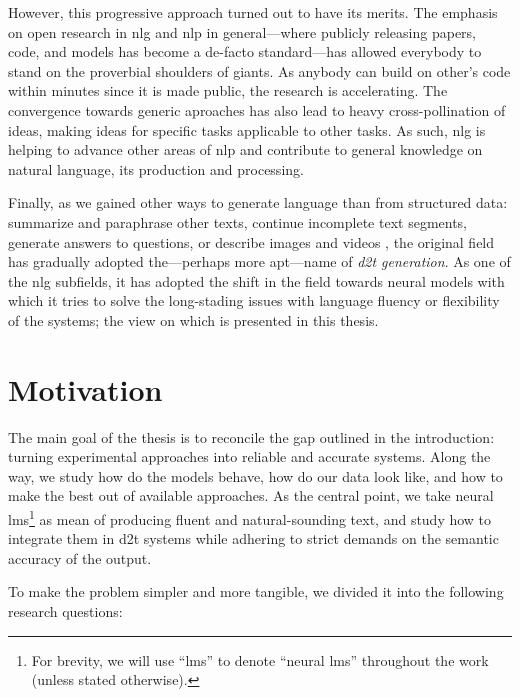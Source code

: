 \documentclass[12pt,notitlepage,a4paper,openright]{report}
\begin{document}
However, this progressive approach turned out to have its merits. The emphasis on open research in \ac{nlg} and \ac{nlp} in general---where publicly releasing papers, code, and models has become a de-facto standard---has allowed everybody to stand on the proverbial shoulders of giants. As anybody can build on other's code within minutes since it is made public, the research is accelerating. The convergence towards generic aproaches has also lead to heavy cross-pollination of ideas, making ideas for specific tasks applicable to other tasks. As such, \ac{nlg} is helping to advance other areas of \ac{nlp} and contribute to general knowledge on natural language, its production and processing.

Finally, as we gained other ways to generate language than from structured data: summarize and paraphrase other texts, continue incomplete text segments, generate answers to questions, or describe images and videos \cite{Dong2021ASO}, the original field has gradually adopted the---perhaps more apt---name of \textit{\ac{d2t} generation}. As one of the \ac{nlg} subfields, it has adopted the shift in the field towards neural models with which it tries to solve the long-stading issues with language fluency or flexibility of the systems; the view on which is presented in this thesis.






\section{Motivation}
\label{sec:rq}

The main goal of the thesis is to reconcile the gap outlined in the introduction: turning experimental approaches into reliable and accurate systems. Along the way, we study how do the models behave, how do our data look like, and how to make the best out of available approaches. As the central point, we take neural \acp{lm}\footnote{For brevity, we will use ``\acp{lm}'' to denote ``neural \acp{lm}'' throughout the work (unless stated otherwise).} as mean of producing fluent and natural-sounding text, and study how to integrate them in \ac{d2t} systems while adhering to strict demands on the semantic accuracy of the output.

To make the problem simpler and more tangible, we divided it into the following research questions:
\end{document}
